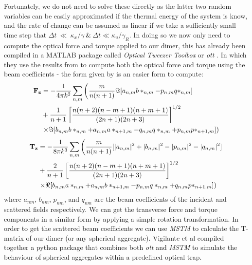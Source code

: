 Fortunately, we do not need to solve these directly as the latter two
random variables can be easily approximated if the thermal energy of
the system is know, and the rate of change can be assumed as linear if
we take a sufficiently small time step that
$\Delta t~\ll~\kappa_x/\gamma \ \& \ \Delta t \ll
\kappa_u/\gamma_R$. In doing so we now only need to compute the
optical force and torque applied to our dimer, this has already been
compiled in a MATLAB package called \textit{Optical Tweezer Toolbox}
or \textit{ott} \cite{Nieminen2007}. In which they use the results
from \cite{Farsund1996} to compute both the optical force and torque
using the beam coefficients - the form given by
\cite{Crichton2000THEMD} is an easier form to compute:
\begin{equation}
\begin{split}
  \bold{F_z}
  &=
    -\frac{1}{4\pi k^2}\sum_{n,m} \left(\frac{m}{n(n+1)}\Im[a_{n,m}b*_{n,m}-p_{n,m}q*_{n,m}] \right.
  \\ 
  &+\frac{1}{n+1}\left[\frac{n(n+2)(n-m+1)(n+m+1)}{(2n+1)(2n+3)} \right]^{1/2}
  \\
  & \left. \times \Im[b_{n,m}b*_{n,m}+a_{n,m}a*_{n+1,m} - q_{n,m}q*_{n,m}+p_{n,m}p*_{n+1,m}] \right)
\end{split}
\end{equation}
\begin{equation}
\begin{split}
  \bold{T_z}
  &=
    -\frac{1}{8\pi k^3}\sum_{n,m} \left(\frac{m}{n(n+1)}[|a_{n,m}|^2+|b_{n,m}|^2-|p_{n,m}|^2-|q_{n,m}|^2] \right.
  \\ 
  &+\frac{2}{n+1}\left[\frac{n(n+2)(n-m+1)(n+m+1)}{(2n+1)(2n+3)} \right]^{1/2}
  \\
  & \left. \times \Re[b_{n,m}a*_{n,m}+a_{n,m}b*_{n+1,m} - p_{n,m}q*_{n,m}+q_{n,m}p*_{n+1,m}] \right)
\end{split}
\end{equation}
where $a_{nm}$, $b_{nm}$, $p_{nm}$, and $q_{nm}$ are the beam coefficients of the incident and scattered fields respectively. We can get the transverse force and torque components in a similar form by applying a simple rotation transformation. In order to get the scattered beam coefficients we can use \textit{MSTM} \cite{Mackowski2011} to calculate the T-matrix of our dimer (or any spherical aggregate). Vigilante et al compiled together a python package that combines both \textit{ott} and \textit{MSTM} to simulate the behaviour of spherical aggregates within a predefined optical trap. 

